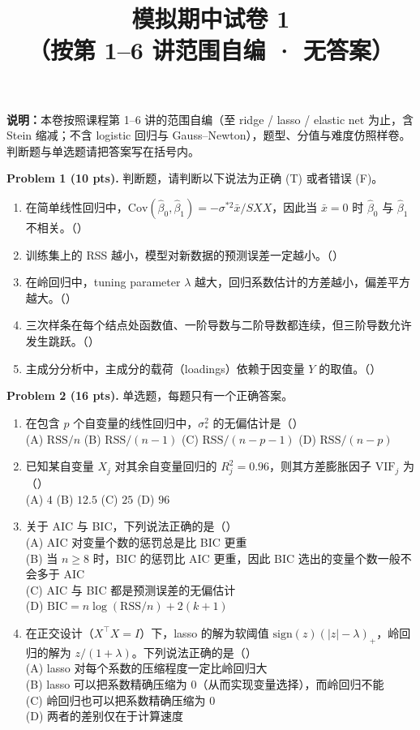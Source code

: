 \documentclass[11pt]{ctexart}
\title{\textbf{模拟期中试卷 1}\\[0.2em]
\large （按第 1--6 讲范围自编 · 无答案）}
\author{}
\date{}
\newcommand{\fillblank}{\mbox{（\qquad）}}
\begin{document}
\maketitle
\vspace{-1.2cm}

\noindent\textbf{说明：}本卷按照课程第 1--6 讲的范围自编（至 ridge / lasso / elastic net 为止，含 Stein 缩减；不含 logistic 回归与 Gauss--Newton），题型、分值与难度仿照样卷。判断题与单选题请把答案写在括号内。

\vspace{0.6em}

\noindent\textbf{Problem 1 (10 pts).} 判断题，请判断以下说法为正确 (T) 或者错误 (F)。
\begin{enumerate}
\item 在简单线性回归中，$\mathrm{Cov}(\hat\beta_0, \hat\beta_1) = -\sigma^{*2}\bar{x}/SXX$，因此当 $\bar{x} = 0$ 时 $\hat\beta_0$ 与 $\hat\beta_1$ 不相关。\fillblank
\item 训练集上的 RSS 越小，模型对新数据的预测误差一定越小。\fillblank
\item 在岭回归中，tuning parameter $\lambda$ 越大，回归系数估计的方差越小，偏差平方越大。\fillblank
\item 三次样条在每个结点处函数值、一阶导数与二阶导数都连续，但三阶导数允许发生跳跃。\fillblank
\item 主成分分析中，主成分的载荷（loadings）依赖于因变量 $Y$ 的取值。\fillblank
\end{enumerate}

\noindent\textbf{Problem 2 (16 pts).} 单选题，每题只有一个正确答案。
\begin{enumerate}
\item 在包含 $p$ 个自变量的线性回归中，$\sigma_*^2$ 的无偏估计是\fillblank\\
(A) $\mathrm{RSS}/n$\quad
(B) $\mathrm{RSS}/(n-1)$\quad
(C) $\mathrm{RSS}/(n-p-1)$\quad
(D) $\mathrm{RSS}/(n-p)$
\item 已知某自变量 $X_j$ 对其余自变量回归的 $R_j^2 = 0.96$，则其方差膨胀因子 $\mathrm{VIF}_j$ 为\fillblank\\
(A) $4$\quad
(B) $12.5$\quad
(C) $25$\quad
(D) $96$
\item 关于 AIC 与 BIC，下列说法正确的是\fillblank\\
(A) AIC 对变量个数的惩罚总是比 BIC 更重\\
(B) 当 $n \geq 8$ 时，BIC 的惩罚比 AIC 更重，因此 BIC 选出的变量个数一般不会多于 AIC\\
(C) AIC 与 BIC 都是预测误差的无偏估计\\
(D) $\mathrm{BIC} = n\log(\mathrm{RSS}/n) + 2(k+1)$
\item 在正交设计（$X^{\top}X = I$）下，lasso 的解为软阈值 $\mathrm{sign}(z)(|z|-\lambda)_+$，岭回归的解为 $z/(1+\lambda)$。下列说法正确的是\fillblank\\
(A) lasso 对每个系数的压缩程度一定比岭回归大\\
(B) lasso 可以把系数精确压缩为 $0$（从而实现变量选择），而岭回归不能\\
(C) 岭回归也可以把系数精确压缩为 $0$\\
(D) 两者的差别仅在于计算速度
\end{enumerate}
\end{document}
